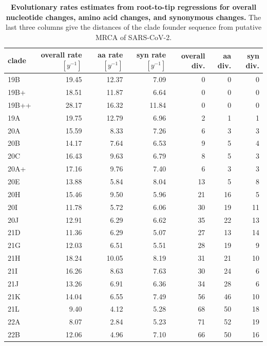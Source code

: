 \documentclass[aps,rmp, twocolumn]{revtex4}
\begin{document}
\begin{table}
\begin{tabular}{l|rrrrrr}
    \hline
    {\bf clade} &  overall rate $[y^{-1}]$ & aa rate $[y^{-1}]$ &  syn rate $[y^{-1}]$ & overall div. &  aa div. &  syn div. \\
    \hline
    19B &     19.45 &    12.37 &      7.09 &        0 &       0 &        0 \\
    19B+ &     18.51 &    11.87 &      6.64 &        0 &       0 &        0 \\
    19B++ &     28.17 &    16.32 &     11.84 &        0 &       0 &        0 \\
    19A &     19.75 &    12.79 &      6.96 &        2 &       1 &        1 \\
    20A &     15.59 &     8.33 &      7.26 &        6 &       3 &        3 \\
     20B &     14.17 &     7.64 &      6.53 &        9 &       5 &        4 \\
     20C &     16.43 &     9.63 &      6.79 &        8 &       5 &        3 \\
    20A+ &     17.16 &     9.76 &      7.40 &        6 &       3 &        3 \\
     20E &     13.88 &     5.84 &      8.04 &       13 &       5 &        8 \\
     20H &     15.46 &     9.50 &      5.96 &       21 &      16 &        5 \\
     20I &     11.78 &     5.72 &      6.06 &       30 &      19 &       11 \\
     20J &     12.91 &     6.29 &      6.62 &       35 &      22 &       13 \\
     21D &     11.36 &     6.29 &      5.07 &       27 &      13 &       14 \\
     21G &     12.03 &     6.51 &      5.51 &       28 &      19 &        9 \\
     21H &     18.24 &    10.05 &      8.19 &       31 &      21 &       10 \\
     21I &     16.26 &     8.63 &      7.63 &       30 &      24 &        6 \\
     21J &     13.26 &     6.91 &      6.36 &       34 &      28 &        6 \\
     21K &     14.04 &     6.55 &      7.49 &       56 &      46 &       10 \\
     21L &      9.40 &     4.12 &      5.28 &       68 &      50 &       18 \\
     22A &      8.07 &     2.84 &      5.23 &       71 &      52 &       19 \\
     22B &     12.06 &     4.96 &      7.10 &       66 &      50 &       16 \\
         \hline
    \end{tabular}
\caption{{\bf Evolutionary rates estimates from root-to-tip regressions for overall nucleotide changes, amino acid changes, and synonymous changes.}
    The last three columns give the distances of the clade founder sequence from putative MRCA of SARS-CoV-2.
\label{tab:rates}}
\end{table}
\end{document}

